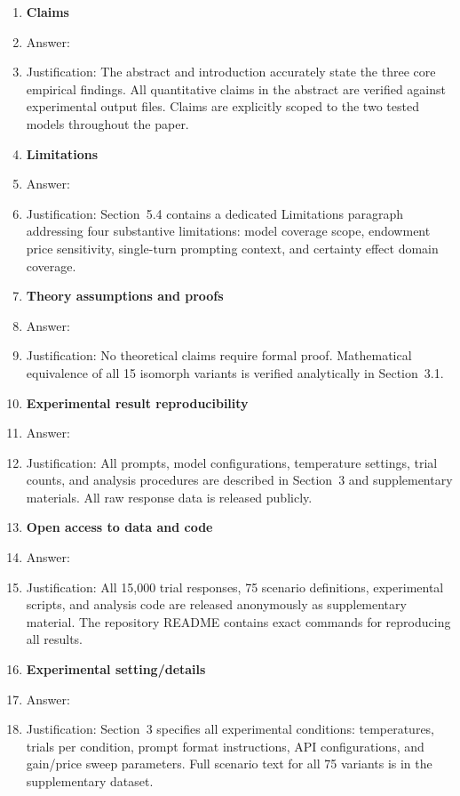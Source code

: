 \documentclass{article}
\begin{document}
\begin{enumerate}

\item \textbf{Claims}
\item[] Answer: \answerYes{}
\item[] Justification: The abstract and introduction accurately state the three core empirical findings.
All quantitative claims in the abstract are verified against experimental output files. Claims are
explicitly scoped to the two tested models throughout the paper.

\item \textbf{Limitations}
\item[] Answer: \answerYes{}
\item[] Justification: Section~5.4 contains a dedicated Limitations paragraph addressing four
substantive limitations: model coverage scope, endowment price sensitivity, single-turn prompting
context, and certainty effect domain coverage.

\item \textbf{Theory assumptions and proofs}
\item[] Answer: \answerNA{}
\item[] Justification: No theoretical claims require formal proof. Mathematical equivalence of all 15
isomorph variants is verified analytically in Section~3.1.

\item \textbf{Experimental result reproducibility}
\item[] Answer: \answerYes{}
\item[] Justification: All prompts, model configurations, temperature settings, trial counts, and
analysis procedures are described in Section~3 and supplementary materials. All raw response data
is released publicly.

\item \textbf{Open access to data and code}
\item[] Answer: \answerYes{}
\item[] Justification: All 15,000 trial responses, 75 scenario definitions, experimental scripts, and
analysis code are released anonymously as supplementary material. The repository README contains
exact commands for reproducing all results.

\item \textbf{Experimental setting/details}
\item[] Answer: \answerYes{}
\item[] Justification: Section~3 specifies all experimental conditions: temperatures, trials per
condition, prompt format instructions, API configurations, and gain/price sweep parameters. Full
scenario text for all 75 variants is in the supplementary dataset.


\end{enumerate}
\end{document}
